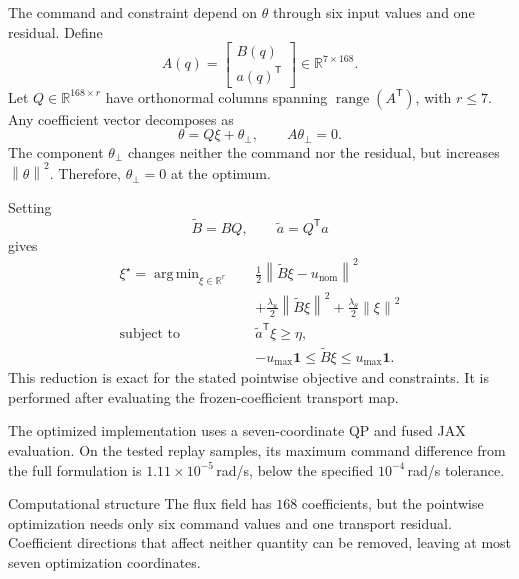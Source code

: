\documentclass[conference]{IEEEtran}
\newcommand{\R}{\mathbb{R}}
\newcommand{\trans}{^{\mathsf T}}
\newcommand{\norm}[1]{\left\lVert#1\right\rVert}
\DeclareMathOperator*{\argmin}{arg\,min}
\DeclareMathOperator{\range}{range}
\begin{document}
The command and constraint depend on $\theta$
through six input values and one residual.
Define
\begin{equation}
    A(q)=
    \begin{bmatrix}
        B(q)\\a(q)\trans
    \end{bmatrix}
    \in\R^{7\times168}.
\end{equation}
Let $Q\in\R^{168\times r}$ have orthonormal
columns spanning $\range(A\trans)$, with $r\leq7$.
Any coefficient vector decomposes as
\begin{equation}
    \theta=Q\xi+\theta_\perp,\qquad
    A\theta_\perp=0.
\end{equation}
The component $\theta_\perp$ changes neither
the command nor the residual, but increases
$\norm{\theta}^2$. Therefore,
$\theta_\perp=0$ at the optimum.

Setting
\begin{equation}
    \widetilde B=BQ,\qquad
    \widetilde a=Q\trans a
\end{equation}
gives
\begin{equation}
\begin{aligned}
    \xi^\star=\argmin_{\xi\in\R^r}\quad&
    \frac12\norm{\widetilde B\xi-u_{\mathrm{nom}}}^2\\
    &+\frac{\lambda_u}{2}\norm{\widetilde B\xi}^2
    +\frac{\lambda_\theta}{2}\norm{\xi}^2\\
    \text{subject to}\quad&
    \widetilde a\trans\xi\geq\eta,\\
    &-u_{\max}\mathbf1
    \leq\widetilde B\xi
    \leq u_{\max}\mathbf1.
    \label{eq:reduced}
\end{aligned}
\end{equation}
This reduction is exact for the stated pointwise
objective and constraints. It is performed after
evaluating the frozen-coefficient transport map.

The optimized implementation uses a seven-coordinate
QP and fused JAX evaluation. On the tested replay
samples, its maximum command difference from
the full formulation is
$1.11\times10^{-5}$\,rad/s, below the specified
$10^{-4}$\,rad/s tolerance.

\begin{methodbox}{Computational structure}
The flux field has $168$ coefficients, but the
pointwise optimization needs only six command values
and one transport residual. Coefficient directions
that affect neither quantity can be removed,
leaving at most seven optimization coordinates.
\end{methodbox}
\end{document}
